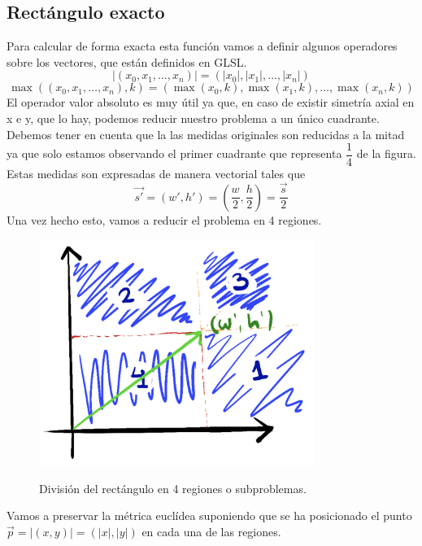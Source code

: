 \subsection{Rectángulo exacto}
Para calcular de forma exacta esta función vamos a definir algunos operadores sobre los vectores, que están definidos en GLSL.
\[\vert(x_0,x_1,\dots,x_n)\vert=(\vert x_0\vert,\vert x_1\vert,\dots,\vert x_n \vert)\]
\[\max\left((x_0,x_1,\dots,x_n), k\right)=(\max( x_0, k), \max(x_1, k),\dots, \max(x_n, k))\]
El operador valor absoluto es muy útil ya que, en caso de existir simetría axial en x e y, que lo hay, podemos reducir nuestro problema a un único cuadrante. Debemos tener en cuenta que la las medidas originales son reducidas a la mitad ya que solo estamos observando el primer cuadrante que representa \(\dfrac{1}{4}\) de la figura. Estas medidas son expresadas de manera vectorial tales que \[\Vec{s'}=(w', h')=\left(\dfrac{w}{2},\dfrac{h}{2}\right)=\dfrac{\Vec{s}}{2}\]
Una vez hecho esto, vamos a reducir el problema en 4 regiones.
\begin{figure}[H]
  \centering
  \captionsetup{justification=centering}%
  \includegraphics[width=0.8\textwidth]{secciones/imagenes/sdf_rect_calc.jpeg}\label{fig:subproblem}
  \caption{División del rectángulo en 4 regiones o subproblemas.}
\end{figure}
Vamos a preservar la métrica euclídea suponiendo que se ha posicionado el punto \(\Vec{p}=\vert(x,y)\vert=(\vert x\vert, \vert y \vert)\) en cada una de las regiones.
